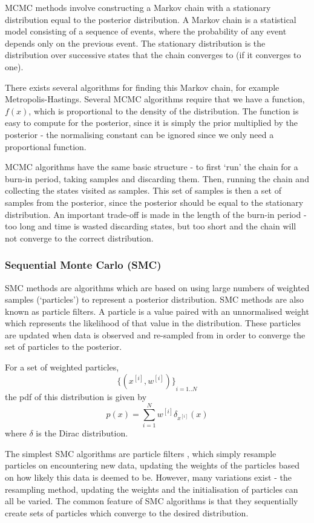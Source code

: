 \documentclass[sigconf]{acmart}
\begin{document}
MCMC methods involve constructing a Markov chain with a stationary distribution equal to the posterior distribution. A Markov chain is a statistical model consisting of a sequence of events, where the probability of any event depends only on the previous event. The stationary distribution is the distribution over successive states that the chain converges to (if it converges to one).

There exists several algorithms for finding this Markov chain, for example Metropolis-Hastings. Several MCMC algorithms require that we have a function, $f(x)$, which is proportional to the density of the distribution. The function is easy to compute for the posterior, since it is simply the prior multiplied by the posterior - the normalising constant can be ignored since we only need a proportional function.

MCMC algorithms have the same basic structure - to first `run' the chain for a burn-in period, taking samples and discarding them. Then, running the chain and collecting the states visited as samples. This set of samples is then a set of samples from the posterior, since the posterior should be equal to the stationary distribution. An important trade-off is made in the length of the burn-in period - too long and time is wasted discarding states, but too short and the chain will not converge to the correct distribution.

\subsubsection{Sequential Monte Carlo (SMC)}

SMC methods are algorithms which are based on using large numbers of weighted samples (`particles') to represent a posterior distribution. SMC methods are also known as particle filters. A particle is a value paired with an unnormalised weight which represents the likelihood of that value in the distribution. These particles are updated when data is observed and re-sampled from in order to converge the set of particles to the posterior.

For a set of weighted particles,
\[{\{(x^{[i]}, w^{[i]})\}}_{i=1..N}\]
%
the pdf of this distribution is given by
%
\[
  p(x) = \sum_{i=1}^{N}w^{[i]}\delta_{x^{[i]}}(x)
\]
where $\delta$ is the Dirac distribution.

The simplest SMC algorithms are particle filters \cite{particlefilter}, which simply resample particles on encountering new data, updating the weights of the particles based on how likely this data is deemed to be. However, many variations exist - the resampling method, updating the weights and the initialisation of particles can all be varied. The common feature of SMC algorithms is that they sequentially create sets of particles which converge to the desired distribution.
\end{document}
